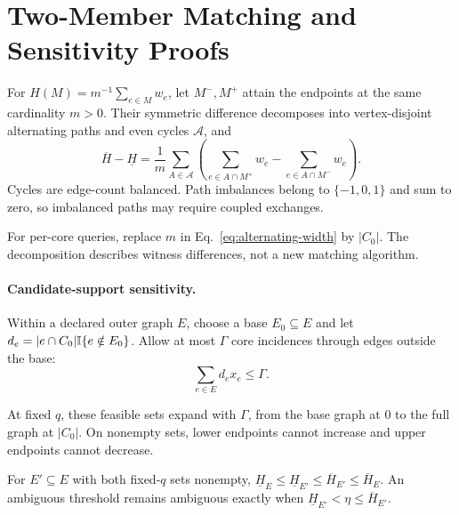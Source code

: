 \section{Two-Member Matching and Sensitivity Proofs}

\begin{theorem}
\label{thm:k2alternating}
For $H(M)=m^{-1}\sum_{e\in M}w_e$, let $M^-,M^+$ attain the endpoints
at the same cardinality $m>0$. Their symmetric difference decomposes into
vertex-disjoint alternating paths and even cycles $\mathcal A$, and
\begin{equation}
 \overline H-\underline H
 =\frac1m\sum_{A\in\mathcal A}
 \left(\sum_{e\in A\cap M^+}w_e-
       \sum_{e\in A\cap M^-}w_e\right).
 \label{eq:alternating-width}
\end{equation}
Cycles are edge-count balanced. Path imbalances belong to $\{-1,0,1\}$ and
sum to zero, so imbalanced paths may require coupled exchanges.
\end{theorem}

For per-core queries, replace $m$ in Eq.~\eqref{eq:alternating-width} by
$|C_0|$. The decomposition describes witness differences, not a new matching
algorithm.

\paragraph{Candidate-support sensitivity.}
Within a declared outer graph $E$, choose a base $E_0\subseteq E$ and let
$d_e=|e\cap C_0|\mathbb I\{e\notin E_0\}$. Allow at most $\Gamma$ core
incidences through edges outside the base:
\begin{equation}
 \sum_{e\in E}d_ex_e\le\Gamma.
 \label{eq:k2omission}
\end{equation}

\begin{proposition}
\label{prop:k2omission}
At fixed $q$, these feasible sets expand with $\Gamma$, from the base graph
at $0$ to the full graph at $|C_0|$. On nonempty sets, lower endpoints cannot
increase and upper endpoints cannot decrease.
\end{proposition}

\begin{proposition}
\label{prop:k2thresholdcontraction}
For $E'\subseteq E$ with both fixed-$q$ sets nonempty,
$\underline H_E\le\underline H_{E'}\le\overline H_{E'}\le\overline H_E$.
An ambiguous threshold remains ambiguous exactly when
$\underline H_{E'}<\eta\le\overline H_{E'}$.
\end{proposition}

